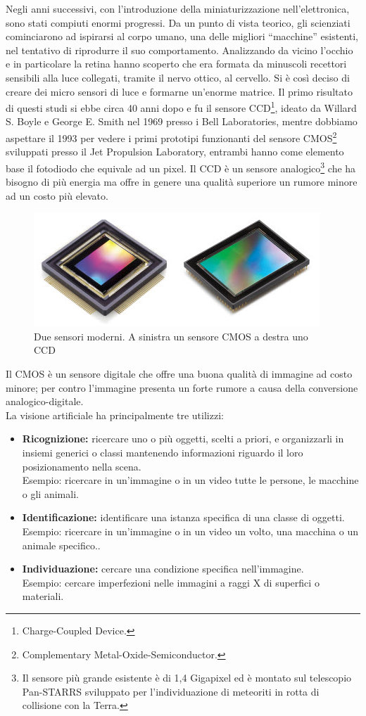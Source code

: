 Negli anni successivi, con l'introduzione della miniaturizzazione nell'elettronica, 
sono stati compiuti enormi progressi. Da un punto di vista teorico, gli scienziati 
cominciarono ad ispirarsi al corpo umano, una delle migliori ``macchine'' esistenti, 
nel tentativo di riprodurre il suo comportamento. Analizzando da vicino
l'occhio e in particolare la retina hanno scoperto che era formata da minuscoli 
recettori sensibili alla luce collegati, tramite il nervo ottico, al cervello. 
Si è così deciso di creare dei 
micro sensori di luce e formarne un'enorme matrice. Il primo risultato di questi studi 
si ebbe circa 40 anni dopo e fu il sensore CCD\footnote{Charge-Coupled Device.}, 
ideato da Willard S. Boyle e George E. Smith nel 1969 presso i Bell Laboratories,
mentre dobbiamo aspettare il 1993 per vedere i primi prototipi funzionanti del 
sensore CMOS\footnote{Complementary Metal-Oxide-Semiconductor.} sviluppati presso 
il Jet Propulsion Laboratory, entrambi hanno come elemento base il fotodiodo che 
equivale ad un pixel. Il CCD è un sensore 
analogico\footnote{Il sensore più grande esistente è di 1,4 Gigapixel ed è 
montato sul telescopio Pan-STARRS sviluppato per l'individuazione di meteoriti in
 rotta di collisione con la Terra.} che ha bisogno di più energia 
ma offre in genere una qualità superiore un rumore minore ad un costo più elevato.\\
\begin{figure}[!htb] \center
\includegraphics[scale=0.8]{immagini/ccd-cmos.png}
\caption{Due sensori moderni. A sinistra un sensore CMOS a destra uno CCD} 
\end{figure}
Il CMOS è un sensore digitale che offre una buona qualità di immagine ad costo minore;
per contro l'immagine presenta un forte rumore a causa della conversione 
analogico-digitale.\\
La visione artificiale ha principalmente tre utilizzi:
\begin{itemize}
\item \textbf{Ricognizione:} ricercare uno o più oggetti, scelti a priori, e organizzarli in 
insiemi generici o classi mantenendo informazioni riguardo il loro posizionamento 
nella scena. \\Esempio: ricercare in un'immagine o in un video tutte le persone, 
le macchine o gli animali. 
\item \textbf{Identificazione:} identificare una istanza specifica di una classe 
di oggetti. \\Esempio: ricercare in un'immagine o in un video un volto, 
una macchina o un animale specifico.. 
\item \textbf{Individuazione:} cercare una condizione specifica nell'immagine. 
\\Esempio: cercare imperfezioni nelle immagini a raggi X di superfici o materiali.
\end{itemize}
